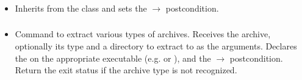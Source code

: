 \subsubsection*{}\label{subsec:RunChecker}

\begin{itemize}[label={}]
    \item Inherits from the \hyperref[subsec:Run]{} class and sets the
          \hyperref[subsec:ExitCodePostcondition]{} $\rightarrow$ 
          postcondition.
\end{itemize}

\subsubsection*{}\label{subsec:ExtractArchive}

\begin{itemize}[label={}]
    \item Command to extract various types of archives.
          Receives the archive, optionally its type and a directory to extract to as the arguments.
          Declares the \hyperref[subsec:ProgramExistsPrerequisite]{} on the
          appropriate executable (e.g.  or ), and the
          \hyperref[subsec:ExitCodePostcondition]{} $\rightarrow$ 
          postcondition.
          Return the  exit status if the archive type is not recognized.
\end{itemize}
